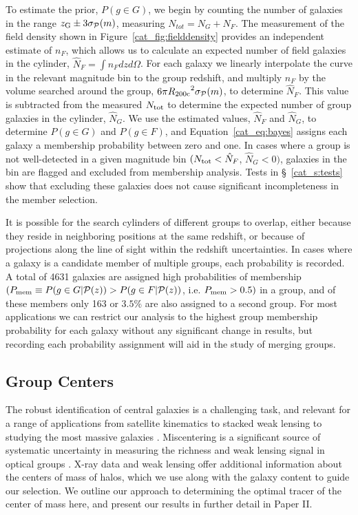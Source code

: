 To estimate the prior, $P(g \in G)$, we begin by counting the number
of galaxies in the range $\mbox{$z_{\rm G}$} \pm 3\sigma_{\mathcal{P}}(m)$, measuring
$N_{tot}=N_{G}+N_{F}$. The measurement of the field density shown in
Figure~\ref{cat_fig:fielddensity} provides an independent estimate of
$n_{F}$, which allows us to calculate an expected number of field
galaxies in the cylinder, $\hat{N}_F=\int{n_F dz d\Omega}$. For each
galaxy we linearly interpolate the curve in the relevant magnitude bin
to the group redshift, and multiply $n_F$ by the volume searched
around the group, $6\pi\mbox{$R_{200\rm{c}}$}^2\sigma_{\mathcal{P}}(m)$, to determine
$\hat{N}_F$. This value is subtracted from the measured $N_{\rm tot}$ to
determine the expected number of group galaxies in the cylinder,
$\hat{N}_{G}$. We use the estimated values, $\hat{N}_{F}$ and
$\hat{N}_{G}$, to determine $P(g \in G)$ and $P(g \in F)$, and
Equation~\ref{cat_eq:bayes} assigns each galaxy a membership probability
between zero and one. In cases where a group is not well-detected in a given
magnitude bin $(N_{\rm tot}<\hat{N}_{F}$, \ie{} $\hat{N}_{G}<0)$, galaxies
in the bin are flagged and excluded from membership
analysis. Tests in \S~\ref{cat_s:tests} show that excluding these galaxies
does not cause significant incompleteness in the member selection.

It is possible for the search cylinders of different groups to
overlap, either because they reside in neighboring positions at the
same redshift, or because of projections along the line of sight
within the redshift uncertainties. In cases where a galaxy is a
candidate member of multiple groups, each probability is
recorded. A total of 4631 galaxies are assigned high 
probabilities of membership $(P_{\rm mem} \equiv P(g \in G|\mbox{$\mathcal{P}(z)$}) > P(g
\in F|\mbox{$\mathcal{P}(z)$})$, i.e. $P_{\rm mem} > 0.5)$ in a group, and of these members only 163 or $3.5\%$ are also
assigned to a second group. For most applications we can restrict our 
analysis to the highest group membership probability for each galaxy
without any significant change in results, but recording each
probability assignment will aid in the study of merging groups.


\subsection{Group Centers}
\label{cat_s:centers}

The robust identification of central galaxies is a challenging task,
and relevant for a range of applications from satellite kinematics to
stacked weak lensing to studying the most massive galaxies
\citep[e.g.,][]{Skibba2011}. Miscentering is a significant source of
systematic uncertainty in measuring the richness and weak lensing
signal in optical groups \citep[e.g.,][]{Johnston2007, Rozo2011,
  Rykoff2011}. X-ray data and weak lensing offer additional
information about the centers of mass of halos, which we use along
with the galaxy content to guide our selection. We outline our approach to
determining the optimal tracer of the center of mass here, and present
our results in further detail in Paper II.

